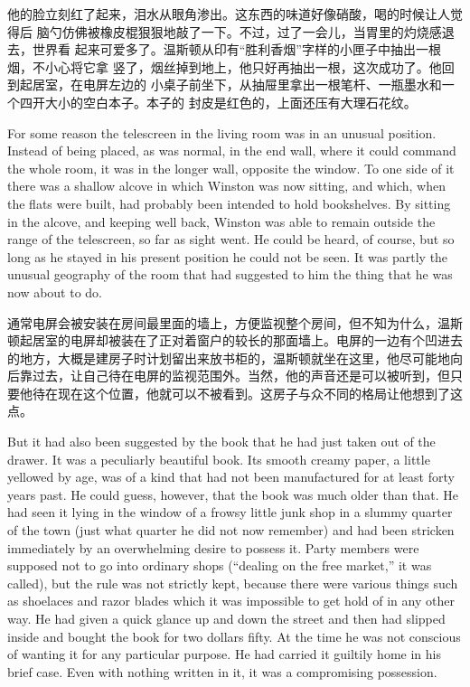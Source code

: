 \begin{paracol}{2}
\switchcolumn


他的脸立刻红了起来，泪水从眼角渗出。这东西的味道好像硝酸，喝的时候让人觉得后
脑勺仿佛被橡皮棍狠狠地敲了一下。不过，过了一会儿，当胃里的灼烧感退去，世界看
起来可爱多了。温斯顿从印有``胜利香烟''字样的小匣子中抽出一根烟，不小心将它拿
竖了，烟丝掉到地上，他只好再抽出一根，这次成功了。他回到起居室，在电屏左边的
小桌子前坐下，从抽屉里拿出一根笔杆、一瓶墨水和一个四开大小的空白本子。本子的
封皮是红色的，上面还压有大理石花纹。

\switchcolumn*

For some reason the telescreen in the living room was in an unusual
position. Instead of being placed, as was normal, in the end wall, where
it could command the whole room, it was in the longer wall, opposite the
window. To one side of it there was a shallow alcove in which Winston
was now sitting, and which, when the flats were built, had probably been
intended to hold bookshelves. By sitting in the alcove, and keeping well
back, Winston was able to remain outside the range of the telescreen, so
far as sight went. He could be heard, of course, but so long as he
stayed in his present position he could not be seen. It was partly the
unusual geography of the room that had suggested to him the thing that
he was now about to do.

\switchcolumn

通常电屏会被安装在房间最里面的墙上，方便监视整个房间，但不知为什么，温斯顿起居室的电屏却被装在了正对着窗户的较长的那面墙上。电屏的一边有个凹进去的地方，大概是建房子时计划留出来放书柜的，温斯顿就坐在这里，他尽可能地向后靠过去，让自己待在电屏的监视范围外。当然，他的声音还是可以被听到，但只要他待在现在这个位置，他就可以不被看到。这房子与众不同的格局让他想到了这点。

\switchcolumn*

But it had also been suggested by the book that he had just taken out of
the drawer. It was a peculiarly beautiful book. Its smooth creamy paper,
a little yellowed by age, was of a kind that had not been manufactured
for at least forty years past. He could guess, however, that the book
was much older than that. He had seen it lying in the window of a frowsy
little junk shop in a slummy quarter of the town (just what quarter he
did not now remember) and had been stricken immediately by an
overwhelming desire to possess it. Party members were supposed not to go
into ordinary shops (``dealing on the free market,'' it was called), but
the rule was not strictly kept, because there were various things such
as shoelaces and razor blades which it was impossible to get hold of in
any other way. He had given a quick glance up and down the street and
then had slipped inside and bought the book for two dollars fifty. At
the time he was not conscious of wanting it for any particular purpose.
He had carried it guiltily home in his brief case. Even with nothing
written in it, it was a compromising possession.


\end{paracol}
